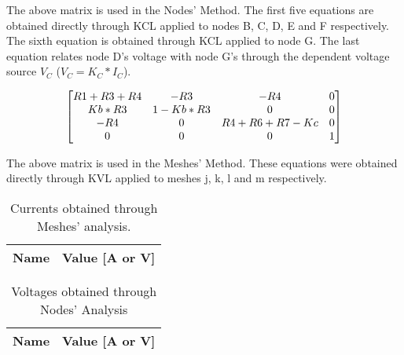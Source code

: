 The above matrix is used in the Nodes' Method. The first five equations are obtained directly through KCL applied to nodes B, C, D, E and F respectively. The sixth equation is obtained through KCL applied to node G. The last equation relates node D's voltage with node G's through the dependent voltage source $V_C$ ($V_C=K_C*I_C$).

\begin{equation}
\begin{bmatrix}
\centering
R1+R3+R4 & -R3 & -R4 & 0\\
Kb*R3 & 1-Kb*R3 & 0 & 0\\
-R4 & 0 & R4+R6+R7-Kc & 0\\
 0 & 0 & 0 & 1
\end{bmatrix}
\end{equation}
\par
\par
The above matrix is used in the Meshes' Method. These equations were obtained directly through KVL applied to meshes j, k, l and m respectively.


\begin{table}[h]
  \centering
  \begin{tabular}{|l|r|}
    \hline    
    {\bf Name} & {\bf Value [A or V]} \\ \hline
    
  \end{tabular}
  \caption{Currents obtained through Meshes' analysis.}
  \label{tab:MA}
\end{table}

\begin{table}[h]
  \centering
  \begin{tabular}{|l|r|}
    \hline
    {\bf Name} & {\bf Value [A or V]} \\ \hline
    
  \end{tabular}
  \caption{Voltages obtained through Nodes' Analysis}
  \label{tab:NA}
\end{table}

